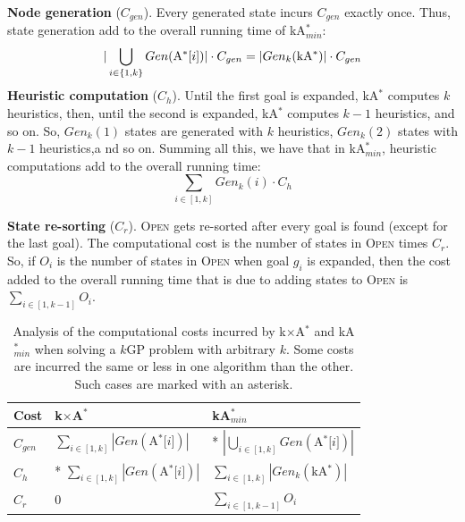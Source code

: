 \documentclass{aicom2e}
\newcommand{\kgs}{$k$GP}
\newcommand{\kastar}{kA$^*$}
\newcommand{\kastarmin}{kA$^*_{min}$}
\newcommand{\kxastar}{k$\times$A$^*$}
\newcommand{\astari}[1]{A$^*$[$#1$]}
\newcommand{\open}{\textsc{Open}}
\begin{document}
{\bf Node generation} ($C_{gen}$). Every generated state incurs
$C_{gen}$ exactly once. Thus, state generation add to the overall running time of \kastarmin{}:
\[
|\bigcup_{i\in{\{1,k\}}} Gen(\text{\astari{i}})|\cdot C_{gen} =
|Gen_k(\text{\kastar{}})|\cdot C_{gen}  \displaystyle
\]
{\bf Heuristic computation} ($C_{h}$). 
Until the first goal is expanded, \kastar{} computes $k$ heuristics,
then, until the second is expanded, \kastar{} computes $k-1$ heuristics, and so on.
So, $Gen_k(1)$ states are generated with $k$ heuristics,
$Gen_{k}(2)$ states with $k-1$ heuristics,a nd so on. Summing all this, we have that
in \kastarmin{}, heuristic computations add to the overall running time:
\[ \sum_{i\in[1,k]} Gen_k(i)\cdot C_h \]


{\bf State re-sorting} ($C_r$). 
\open{} gets re-sorted after every goal is found (except for the last goal). 
The computational cost is the number of states in \open{} times $C_r$.
So, if $O_i$ is the number of states in \open{} when goal $g_i$ is expanded, then
the cost added to the overall running time that is due to adding states to \open{} is $\sum_{i\in[1,k-1]} O_i$. 

\begin{table}
    \begin{tabular}{|l|l|l|}
        \hline
        Cost        & \kxastar{}                                    & \kastarmin \\ \hline
        $C_{gen}$   & $\sum_{i\in[1,k]} |Gen(\text{\astari{i}})|$       & * $|\bigcup_{i\in[1,k]} Gen(\text{\astari{i}})|$\\
        $C_{h}$     & * $\sum_{i\in[1,k]} |Gen(\text{\astari{i}})|$     & $\sum_{i\in[1,k]} |Gen_k(\text{\kastar{}})|$\\
        $C_r$		&	0												& $\sum_{i\in[1,k-1]} O_i$\\        
        \hline
    \end{tabular}
    \caption{Analysis of the computational costs incurred by \kxastar{} and \kastarmin{}
        when solving a \kgs{} problem with arbitrary $k$.
        Some costs are incurred the same or less in one algorithm than the other. Such cases are marked with an asterisk. }
    \label{tab:time-analysis}
\end{table}
\end{document}
